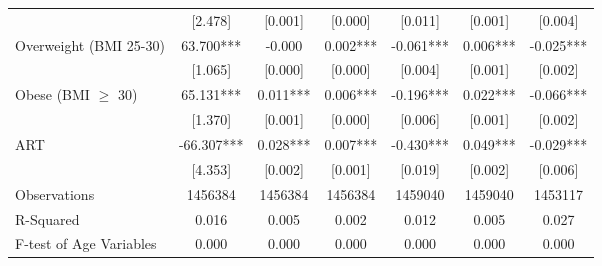 \documentclass[10pt,letterpaper,subeqn]{beamer}
\begin{document}
\begin{frame}
\begin{table}[htbp]
{\begin{tabular}{l*{6}{c}}
    &     [2.478]   &     [0.001]   &     [0.000]   &     [0.011]   &     [0.001]   &     [0.004]   \\
    Overweight (BMI 25-30)&      63.700***&      -0.000   &       0.002***&      -0.061***&       0.006***&      -0.025***\\
    &     [1.065]   &     [0.000]   &     [0.000]   &     [0.004]   &     [0.001]   &     [0.002]   \\
    Obese (BMI $\geq$ 30)&      65.131***&       0.011***&       0.006***&      -0.196***&       0.022***&      -0.066***\\
    &     [1.370]   &     [0.001]   &     [0.000]   &     [0.006]   &     [0.001]   &     [0.002]   \\
    ART                 &     -66.307***&       0.028***&       0.007***&      -0.430***&       0.049***&      -0.029***\\
    &     [4.353]   &     [0.002]   &     [0.001]   &     [0.019]   &     [0.002]   &     [0.006]   \\
    \midrule
    Observations        &     1456384   &     1456384   &     1456384   &     1459040   &     1459040   &     1453117   \\
    R-Squared           &       0.016   &       0.005   &       0.002   &       0.012   &       0.005   &       0.027   \\
    F-test of Age Variables&0.000&0.000&0.000&0.000&0.000&0.000 \\
    \bottomrule
\end{tabular}}
\end{table}

\end{frame}
\end{document}
